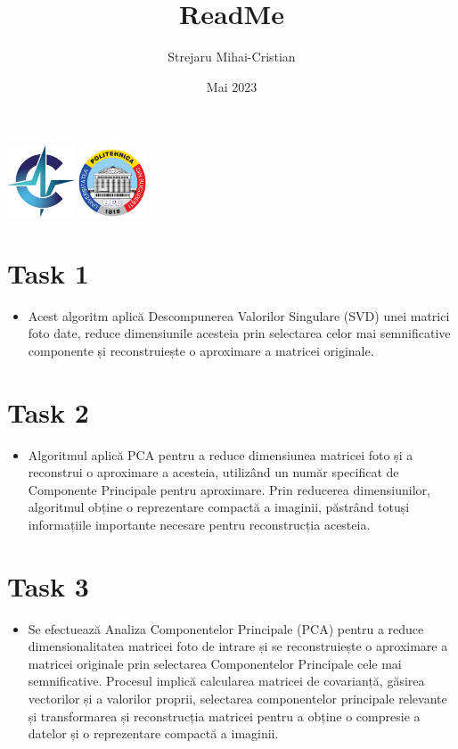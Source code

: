 \documentclass{article}
\title{ReadMe}
\author{Strejaru Mihai-Cristian}
\date{Mai 2023}
\begin{document}
\maketitle
\vspace{-6cm}
\includegraphics[width=2cm]{logo.jpg}
\includegraphics[width=2cm]{upb.png}
\vspace{5cm}
\section{Task 1}
\begin{itemize}
    \item Acest algoritm aplică Descompunerea Valorilor 
    Singulare (SVD) unei matrici foto date, reduce 
    dimensiunile acesteia prin selectarea celor mai 
    semnificative componente și reconstruiește o 
    aproximare a matricei originale.
\end{itemize}

\section{Task 2}
\begin{itemize}
    \item Algoritmul aplică PCA pentru a reduce 
    dimensiunea matricei foto și a reconstrui o 
    aproximare a acesteia, utilizând un număr specificat 
    de Componente Principale pentru 
    aproximare. Prin reducerea dimensiunilor, algoritmul
    obține o reprezentare compactă a imaginii, păstrând 
    totuși informațiile importante necesare pentru 
    reconstrucția acesteia.
\end{itemize}

\section{Task 3}
\begin{itemize}
    \item Se efectuează Analiza Componentelor Principale (PCA) 
    pentru a reduce dimensionalitatea matricei foto de 
    intrare și se reconstruiește o aproximare a matricei 
    originale prin selectarea Componentelor Principale 
    cele mai semnificative. Procesul implică calcularea 
    matricei de covarianță, găsirea vectorilor și a 
    valorilor proprii, selectarea componentelor principale
    relevante și transformarea și reconstrucția matricei 
    pentru a obține o compresie a datelor și o reprezentare 
    compactă a imaginii.
\end{itemize}
\end{document}
